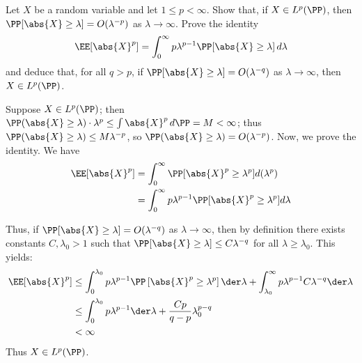 \documentclass[11pt, headheight=30pt]{scrartcl}
\begin{document}
\section{}
\begin{prob*}
    Let $X$ be a random variable and let $1 \leq p < \infty$. Show that, if $X \in L^p(\PP)$,
    then $\PP[\abs{X} \geq \lambda] = O(\lambda^{-p})$ as $\lambda \to \infty$. Prove the identity
    \[
        \EE[\abs{X}^p] = \int_0^\infty p\lambda^{p-1}\PP[\abs{X} \geq \lambda] \, d\lambda
    \]
    and deduce that, for all $q > p$, if $\PP[\abs{X} \geq \lambda] = O(\lambda^{-q})$
    as $\lambda \to \infty$, then $X \in L^p(\PP)$.
\end{prob*}

Suppose $X\in L^p(\PP)$; then $\PP(\abs{X} \geq \lambda)\cdot \lambda^p \leq \int \abs{X}^p \, d\PP = M < \infty$;
thus $\PP(\abs{X} \geq \lambda) \leq M\lambda^{-p}$, so $\PP(\abs{X} \geq \lambda) = O(\lambda^{-p})$.
Now, we prove the identity. We have
\begin{align*}
    \EE[\abs{X}^p] &= \int_0^\infty \PP[\abs{X}^p \geq \lambda^p]d(\lambda^p)\\
    &= \int_0^\infty p\lambda^{p-1} \PP[\abs{X}^p \geq \lambda^p]d\lambda
\end{align*}

Thus, if $\PP[\abs{X} \geq \lambda] = O(\lambda^{-q})$ as $\lambda \to \infty$, then
by definition there exists constants $C, \lambda_0 > 1$ such that
$\PP[\abs{X} \geq \lambda] \leq C\lambda^{-q}$ for all $\lambda \geq \lambda_0$.
This yields:
\begin{align*}
    \EE[\abs{X}^p]
    &\leq \int_0^{\lambda_0} p\lambda^{p-1} \PP\left[\abs{X}^p \geq \lambda^p\right] \der \lambda
    + \int_{\lambda_0}^{\infty} p\lambda^{p-1} C\lambda^{-q} \der \lambda\\
    &\leq \int_0^{\lambda_0} p\lambda^{p-1} \der \lambda + \frac{Cp}{q-p}\lambda_0^{p-q}\\
    &< \infty
\end{align*}
Thus $X\in L^p(\PP)$.

\end{document}
